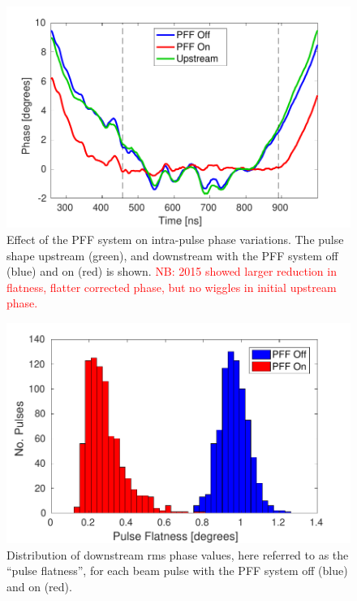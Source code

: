 \documentclass[%
 reprint,
 amsmath,amssymb,
 prl,
]{revtex4-1}
\begin{document}
\begin{figure}
	\includegraphics[width=\columnwidth]{figs/shape}%
	\caption{\label{fig:shape}Effect of the PFF system on intra-pulse phase 
	variations. The pulse shape upstream (green), and downstream with the PFF 
	system off (blue) and on (red) is shown. \textcolor{red}{NB: 
	2015 showed larger reduction in flatness, flatter corrected phase, but no 
	wiggles in initial upstream phase.}}
\end{figure}

\begin{figure}
	\includegraphics[width=\columnwidth]{figs/flatness}%
	\caption{\label{fig:flatness}Distribution of downstream rms phase values, 
	here 
	referred to as the 
	``pulse flatness'', for each beam pulse with the PFF system off (blue) and 
	on (red).}
\end{figure}
\end{document}
